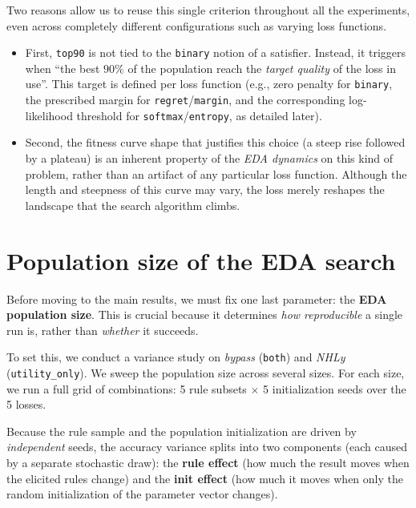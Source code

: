 Two reasons allow us to reuse this single criterion throughout all the experiments, even across completely different configurations such as varying loss functions. 

\begin{itemize}
    \item First, \texttt{top90} is not tied to the \texttt{binary} notion of a satisfier. Instead, it triggers when ``the best $90\%$ of the population reach the \emph{target quality} of the loss in use''. This target is defined per loss function (e.g., zero penalty for \texttt{binary}, the prescribed margin for \texttt{regret}/\texttt{margin}, and the corresponding log-likelihood threshold for \texttt{softmax}/\texttt{entropy}, as detailed later). 

    \item Second, the fitness curve shape that justifies this choice (a steep rise followed by a plateau) is an inherent property of the \emph{EDA dynamics} on this kind of problem, rather than an artifact of any particular loss function. Although the length and steepness of this curve may vary, the loss merely reshapes the landscape that the search algorithm climbs.
\end{itemize}




\newpage


\section{Population size of the EDA search}
\label{sec:popsize}

Before moving to the main results, we must fix one last parameter: the \textbf{EDA population size}. This is crucial because it determines \emph{how reproducible} a single run is, rather than \emph{whether} it succeeds. 

To set this, we conduct a variance study on \emph{bypass} (\texttt{both}) and \emph{NHLy} (\texttt{utility\_only}). We sweep the population size across several sizes. For each size, we run a full grid of combinations: 5 rule subsets $\times$ 5 initialization seeds over the 5 losses.

Because the rule sample and the population initialization are driven by \emph{independent} seeds, the accuracy variance splits into two components (each caused by a separate stochastic draw): the \textbf{rule effect} (how much the result
moves when the elicited rules change) and the \textbf{init effect} (how much it
moves when only the random initialization of the parameter vector changes).

